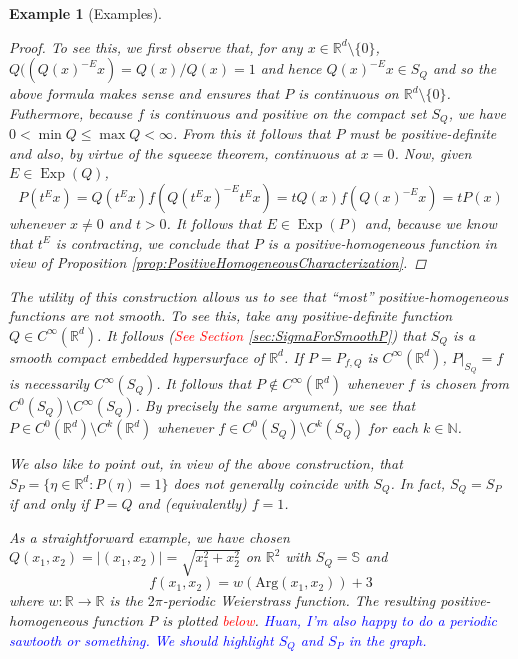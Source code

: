 \documentclass[11pt]{article}
\newtheorem{example}{Example}
\newcommand*{\myproofname}{Proof}
\newenvironment{subproof}[1][\myproofname]{\begin{proof}[#1]\renewcommand*{\qedsymbol}{$\mathbin{/\mkern-6mu/}$}}{\end{proof}}
\newcommand\Exp{\operatorname{Exp}}
\begin{document}
\begin{example}[Examples]
\begin{enumerate}
\begin{subproof}To see this, we first observe that, for any $x\in\mathbb{R}^d\setminus \{0\}$, $Q((Q(x)^{-E}x)=Q(x)/Q(x)=1$ and hence $Q(x)^{-E}x\in S_Q$ and so the above formula makes sense and ensures that $P$ is continuous on $\mathbb{R}^d\setminus\{0\}$. Futhermore, because $f$ is continuous and positive on the compact set $S_Q$, we have $0<\min Q\leq \max Q<\infty$. From this it follows that $P$ must be positive-definite and also, by virtue of the squeeze theorem, continuous at $x=0$. Now, given $E\in\Exp(Q)$,
\begin{equation*}
P(t^Ex)=Q(t^Ex)f(Q(t^Ex)^{-E}t^Ex)=tQ(x)f(Q(x)^{-E}x)=tP(x)
\end{equation*}
whenever $x\neq 0$ and $t>0$. It follows that $E\in\Exp(P)$ and, because we know that $t^E$ is contracting, we conclude that $P$ is a positive-homogeneous function in view of Proposition \ref{prop:PositiveHomogeneousCharacterization}. 
\end{subproof}
 The utility of this construction allows us to see that ``most'' positive-homogeneous functions are not smooth. To see this, take any positive-definite function $Q\in C^{\infty}(\mathbb{R}^d)$. It follows (\textcolor{red}{See Section \ref{sec:SigmaForSmoothP}}) that $S_Q$ is a smooth compact embedded hypersurface of $\mathbb{R}^d$. If $P=P_{f,Q}$ is $C^\infty(\mathbb{R}^d)$, $P\vert_{S_Q}=f$ is necessarily $C^\infty(S_Q)$. It follows that $P\notin C^\infty(\mathbb{R}^d)$ whenever $f$ is chosen from $C^0(S_Q)\setminus C^\infty(S_Q)$. By precisely the same argument, we see that $P\in C^0(\mathbb{R}^d)\setminus C^k(\mathbb{R}^d)$ whenever $f\in C^0(S_Q)\setminus C^k(S_Q)$ for each $k\in\mathbb{N}$.

We also like to point out, in view of the above construction, that $S_P=\{\eta\in\mathbb{R}^d:P(\eta)=1\}$ does not generally coincide with $S_Q$. In fact, $S_Q=S_P$ if and only if $P=Q$ and (equivalently) $f=1$.

As a straightforward example, we have chosen $Q(x_1,x_2)=|(x_1,x_2)|=\sqrt{x_1^2+x_2^2}$ on $\mathbb{R}^2$ with $S_Q=\mathbb{S}$ and 
\begin{equation*}
f(x_1,x_2)=w(\mbox{Arg}(x_1,x_2))+3
\end{equation*}
where $w:\mathbb{R}\to\mathbb{R}$ is the $2\pi$-periodic Weierstrass function. The resulting positive-homogeneous function $P$ is plotted \textcolor{red}{below}. \textcolor{blue}{Huan, I'm also happy to do a periodic sawtooth or something. We should highlight $S_Q$ and $S_P$ in the graph.}
\end{enumerate}
\end{example}
\end{document}
